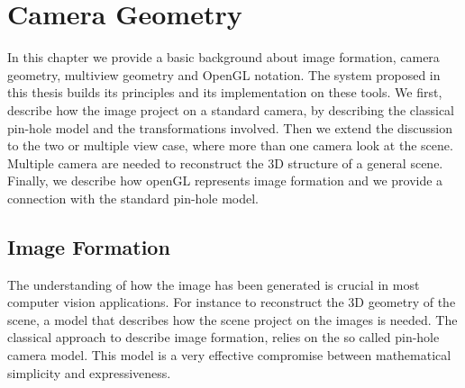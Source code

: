 \chapter{Camera Geometry}
In this chapter we provide a basic background about image formation, camera geometry, multiview geometry and OpenGL notation. 
The system proposed in this thesis builds its principles and its implementation on these tools. 
We first, describe how the image project on a standard camera, by describing the classical pin-hole model and the transformations involved. 
Then we extend the discussion to the two or multiple view case, where more than one camera look at the scene. Multiple camera are needed to reconstruct the 3D structure of a general scene.
Finally, we describe how openGL represents image formation and we provide a connection with the standard pin-hole model.


\minitoc

\section{Image Formation}
The understanding of how the image has been generated is crucial in most computer vision applications. For instance to reconstruct the 3D geometry of the scene, a model that describes how the scene project on the images is needed. 
The classical approach to describe image formation, relies on the so called pin-hole camera model.
This model is a very effective compromise between mathematical simplicity and expressiveness.


